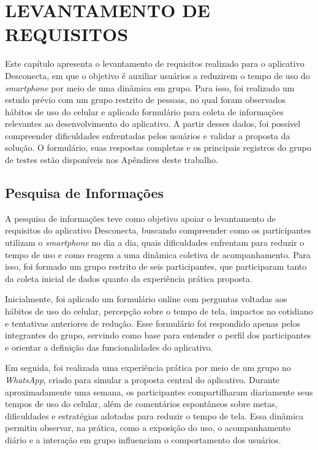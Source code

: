 \chapter{LEVANTAMENTO DE REQUISITOS}

Este capítulo apresenta o levantamento de requisitos realizado para o aplicativo Desconecta, em que o objetivo é auxiliar usuários a reduzirem o tempo de uso do \textit{smartphone} por meio de uma dinâmica em grupo. Para isso, foi realizado um estudo prévio com um grupo restrito de pessoas, no qual foram observados hábitos de uso do celular e aplicado formulário para coleta de informações relevantes ao desenvolvimento do aplicativo. A partir desses dados, foi possível compreender dificuldades enfrentadas pelos usuários e validar a proposta da solução. O formulário, suas respostas completas e os principais registros do grupo de testes estão disponíveis nos Apêndices deste trabalho.

\section{Pesquisa de Informações}

A pesquisa de informações teve como objetivo apoiar o levantamento de requisitos do aplicativo Desconecta, buscando compreender como os participantes utilizam o \textit{smartphone} no dia a dia, quais dificuldades enfrentam para reduzir o tempo de uso e como reagem a uma dinâmica coletiva de acompanhamento. Para isso, foi formado um grupo restrito de seis participantes, que participaram tanto da coleta inicial de dados quanto da experiência prática proposta.

Inicialmente, foi aplicado um formulário online com perguntas voltadas aos hábitos de uso do celular, percepção sobre o tempo de tela, impactos no cotidiano e tentativas anteriores de redução. Esse formulário foi respondido apenas pelos integrantes do grupo, servindo como base para entender o perfil dos participantes e orientar a definição das funcionalidades do aplicativo.

Em seguida, foi realizada uma experiência prática por meio de um grupo no \textit{WhatsApp}, criado para simular a proposta central do aplicativo. Durante aproximadamente uma semana, os participantes compartilharam diariamente seus tempos de uso do celular, além de comentários espontâneos sobre metas, dificuldades e estratégias adotadas para reduzir o tempo de tela. Essa dinâmica permitiu observar, na prática, como a exposição do uso, o acompanhamento diário e a interação em grupo influenciam o comportamento dos usuários.

